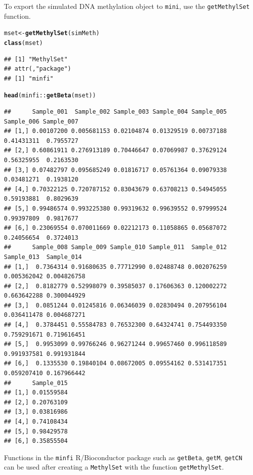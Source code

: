 \documentclass{article}\usepackage[]{graphicx}\usepackage[usenames,dvipsnames]{color}
\makeatletter
\newcommand{\hlopt}[1]{\textcolor[rgb]{0,0,0}{#1}}%
\newcommand{\hlstd}[1]{\textcolor[rgb]{0.345,0.345,0.345}{#1}}%
\newcommand{\hlkwb}[1]{\textcolor[rgb]{0.69,0.353,0.396}{#1}}%
\newcommand{\hlkwd}[1]{\textcolor[rgb]{0.737,0.353,0.396}{\textbf{#1}}}%
\newenvironment{kframe}{%
 \def\at@end@of@kframe{}%
 \ifinner\ifhmode%
  \def\at@end@of@kframe{\end{minipage}}%
  \begin{minipage}{\columnwidth}%
 \fi\fi%
 \def\FrameCommand##1{\hskip\@totalleftmargin \hskip-\fboxsep
 \colorbox{shadecolor}{##1}\hskip-\fboxsep
     \hskip-\linewidth \hskip-\@totalleftmargin \hskip\columnwidth}%
 \MakeFramed {\advance\hsize-\width
   \@totalleftmargin\z@ \linewidth\hsize
   \@setminipage}}%
 {\par\unskip\endMakeFramed%
 \at@end@of@kframe}
\newenvironment{knitrout}{}{} %
\makeatother
\begin{document}
To export the simulated DNA methylation object to \texttt{mini}, 
use the \texttt{getMethylSet} function. 
\begin{knitrout}
\color{fgcolor}\begin{kframe}
\begin{alltt}
\hlstd{mset} \hlkwb{<-} \hlkwd{getMethylSet}\hlstd{(simMeth)}
\hlkwd{class}\hlstd{(mset)}
\end{alltt}
\begin{verbatim}
## [1] "MethylSet"
## attr(,"package")
## [1] "minfi"
\end{verbatim}
\begin{alltt}
\hlkwd{head}\hlstd{(minfi}\hlopt{::}\hlkwd{getBeta}\hlstd{(mset))}
\end{alltt}
\begin{verbatim}
##      Sample_001  Sample_002 Sample_003 Sample_004 Sample_005 Sample_006 Sample_007
## [1,] 0.00107200 0.005681153 0.02104874 0.01329519 0.00737188 0.41431311  0.7955727
## [2,] 0.60861911 0.276913189 0.70446647 0.07069987 0.37629124 0.56325955  0.2163530
## [3,] 0.07482797 0.095685249 0.01816717 0.05761364 0.09079338 0.03481271  0.1938120
## [4,] 0.70322125 0.720787152 0.83043679 0.63708213 0.54945055 0.59193881  0.8029639
## [5,] 0.99486574 0.993225380 0.99319632 0.99639552 0.97999524 0.99397809  0.9817677
## [6,] 0.23069554 0.070011669 0.02212173 0.11058865 0.05687072 0.24056654  0.3724013
##      Sample_008 Sample_009 Sample_010 Sample_011  Sample_012  Sample_013  Sample_014
## [1,]  0.7364314 0.91680635 0.77712990 0.02488748 0.002076259 0.005362042 0.004826758
## [2,]  0.8182779 0.52998079 0.39585037 0.17606363 0.120002272 0.663642288 0.300044929
## [3,]  0.0851244 0.01245816 0.06346039 0.02830494 0.207956104 0.036411478 0.004687271
## [4,]  0.3784451 0.55584783 0.76532300 0.64324741 0.754493350 0.759291671 0.719616451
## [5,]  0.9953099 0.99766246 0.96271244 0.99657460 0.996118589 0.991937581 0.991931844
## [6,]  0.1335530 0.19840104 0.08672005 0.09554162 0.531417351 0.059207410 0.167966442
##      Sample_015
## [1,] 0.01559584
## [2,] 0.20763109
## [3,] 0.03816986
## [4,] 0.74108434
## [5,] 0.98429578
## [6,] 0.35855504
\end{verbatim}
\end{kframe}
\end{knitrout}

Functions in the \texttt{minfi} R/Bioconductor package such as \texttt{getBeta}, \texttt{getM}, \texttt{getCN} can be used after creating a \texttt{MethylSet} with the function \texttt{getMethylSet}. 
\end{document}
